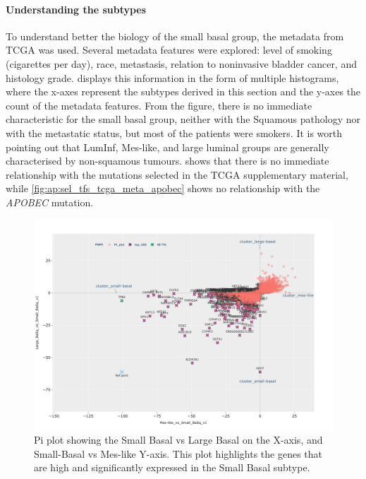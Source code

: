 \paragraph*{Understanding the subtypes} \label{s:N_I:bio_sel_prun}

To understand better the biology of the small basal group, the metadata from TCGA \citet{Robertson2017-mg} was used. Several metadata features were explored: level of smoking (cigarettes per day), race, metastasis, relation to noninvasive bladder cancer, and histology grade.  displays this information in the form of multiple histograms, where the x-axes represent the subtypes derived in this section and the y-axes the count of the metadata features. From the figure, there is no immediate characteristic for the small basal group, neither with the Squamous pathology nor with the metastatic status, but most of the patients were smokers. It is worth pointing out that LumInf, Mes-like, and large luminal groups are generally characterised by non-squamous tumours.  shows that there is no immediate relationship with the mutations selected in the TCGA supplementary material, while \cref{fig:ap:sel_tfs_tcga_meta_apobec} shows no relationship with the \textit{APOBEC} mutation.

\begin{figure}[!htb]   
\centering
\includegraphics[width=1.0\textwidth,height=1.0\textheight,keepaspectratio]{Sections/Network_I/Resources/selective_pruning/pi_gsea/pi_smallBasal.png}
  \caption{Pi plot showing the Small Basal vs Large Basal on the X-axis, and Small-Basal vs Mes-like Y-axis. This plot highlights the genes that are high and significantly expressed in the Small Basal subtype. }
\label{fig:N_I:pi_smallBasal_comp}
\end{figure}

